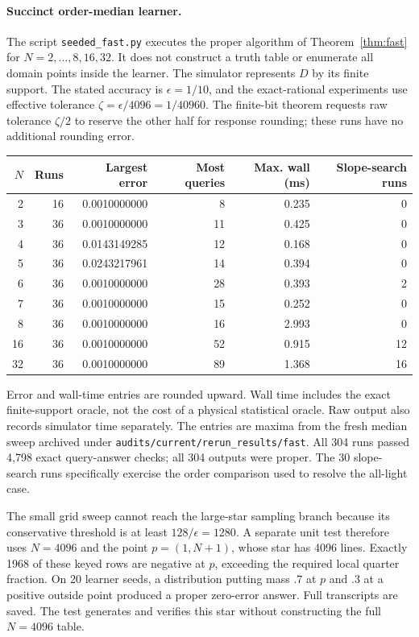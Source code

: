 \paragraph{Succinct order-median learner.}
The script \texttt{seeded\_fast.py} executes the proper algorithm of Theorem~\ref{thm:fast} for $N=2,\ldots,8,16,32$. It does not construct a truth table or enumerate all domain points inside the learner. The simulator represents $D$ by its finite support. The stated accuracy is $\epsilon=1/10$, and the exact-rational experiments use effective tolerance $\zeta=\epsilon/4096=1/40960$. The finite-bit theorem requests raw tolerance $\zeta/2$ to reserve the other half for response rounding; these runs have no additional rounding error.

\begin{center}\small
\begin{tabular}{rrrrrr}
\toprule
$N$&Runs&Largest error&Most queries&Max. wall (ms)&Slope-search runs\\
\midrule
2&16&0.0010000000&8&0.235&0\\
3&36&0.0010000000&11&0.425&0\\
4&36&0.0143149285&12&0.168&0\\
5&36&0.0243217961&14&0.394&0\\
6&36&0.0010000000&28&0.393&2\\
7&36&0.0010000000&15&0.252&0\\
8&36&0.0010000000&16&2.993&0\\
16&36&0.0010000000&52&0.915&12\\
32&36&0.0010000000&89&1.368&16\\
\bottomrule
\end{tabular}
\end{center}
Error and wall-time entries are rounded upward. Wall time includes the exact finite-support oracle, not the cost of a physical statistical oracle. Raw output also records simulator time separately. The entries are maxima from the fresh median sweep archived under \texttt{audits/current/rerun\_results/fast}. All 304 runs passed 4,798 exact query-answer checks; all 304 outputs were proper. The 30 slope-search runs specifically exercise the order comparison used to resolve the all-light case.

The small grid sweep cannot reach the large-star sampling branch because its conservative threshold is at least $128/\epsilon=1280$. A separate unit test therefore uses $N=4096$ and the point $p=(1,N+1)$, whose star has 4096 lines. Exactly 1968 of these keyed rows are negative at $p$, exceeding the required local quarter fraction. On 20 learner seeds, a distribution putting mass $.7$ at $p$ and $.3$ at a positive outside point produced a proper zero-error answer. Full transcripts are saved. The test generates and verifies this star without constructing the full $N=4096$ table.

